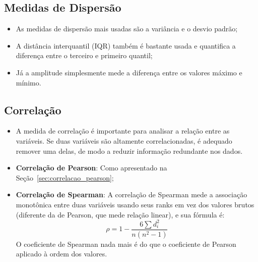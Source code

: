 \documentclass{article}
\begin{document}
\subsection{Medidas de Dispersão}
\begin{itemize}
    \item As medidas de dispersão mais usadas são a variância e o desvio padrão;
    \item A distância interquantil (IQR) também é bastante usada e quantifica a diferença entre o terceiro e primeiro quantil;
    \item Já a amplitude simplesmente mede a diferença entre os valores máximo e mínimo.
\end{itemize}

\subsection{Correlação}
\begin{itemize}
    \item A medida de correlação é importante para analisar a relação entre as variáveis. Se duas variáveis são altamente correlacionadas, é adequado remover uma delas, de modo a reduzir informação redundante nos dados.
    \item \textbf{Correlação de Pearson}: Como apresentado na Seção~\ref{sec:correlacao_pearson};
    \item \textbf{Correlação de Spearman}: A correlação de Spearman mede a associação monotônica entre duas variáveis usando seus ranks em vez dos valores brutos (diferente da de Pearson, que mede relação linear), e sua fórmula é:
    $$
    \rho = 1 - \frac{6 \sum d_i^2}{n(n^2 - 1)}
    $$
    O coeficiente de Spearman nada mais é do que o coeficiente de Pearson aplicado à ordem dos valores.
\end{itemize}
\end{document}
